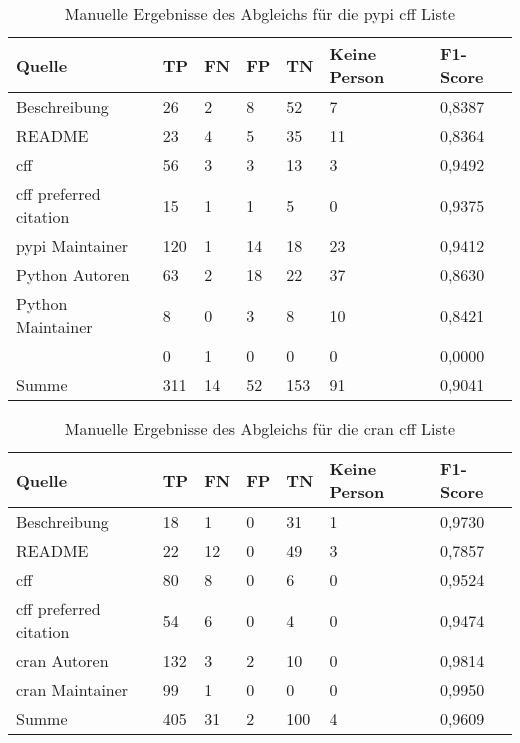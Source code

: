 \begin{table}[H]
    \centering
    \begin{tabularx}{\textwidth}{XR{.7cm}R{.7cm}R{.7cm}R{.7cm}R{2.8cm}R{2cm}}
        \toprule
        \textbf{Quelle} & \textbf{TP} & \textbf{FN} & \textbf{FP} & \textbf{TN} & \textbf{Keine Person} & \textbf{F1-Score} \\ \midrule
        Beschreibung                 & 26  & 2  & 8  & 52  & 7  & 0,8387 \\
        README                       & 23  & 4  & 5  & 35  & 11 & 0,8364 \\
        \gls{cff}                    & 56  & 3  & 3  & 13  & 3  & 0,9492 \\
        \gls{cff} preferred citation & 15  & 1  & 1  & 5   & 0  & 0,9375 \\
        \gls{pypi} Maintainer        & 120 & 1  & 14 & 18  & 23 & 0,9412 \\
        Python Autoren               & 63  & 2  & 18 & 22  & 37 & 0,8630 \\
        Python Maintainer            & 8   & 0  & 3  & 8   & 10 & 0,8421 \\
                      & 0   & 1  & 0  & 0   & 0  & 0,0000 \\ \midrule
        Summe                        & 311 & 14 & 52 & 153 & 91 & 0,9041 \\
        \bottomrule
    \end{tabularx}
    \caption{Manuelle Ergebnisse des Abgleichs für die \gls{pypi} \gls{cff} Liste}
    \label{tab:pypi_cff_matching_results_manual_anhang}
\end{table}

\begin{table}[H]
    \centering
    \begin{tabularx}{\textwidth}{XR{.7cm}R{.7cm}R{.7cm}R{.7cm}R{2.8cm}R{2cm}}
        \toprule
        \textbf{Quelle} & \textbf{TP} & \textbf{FN} & \textbf{FP} & \textbf{TN} & \textbf{Keine Person} & \textbf{F1-Score} \\ \midrule
        Beschreibung                 & 18  & 1  & 0 & 31  & 1 & 0,9730 \\
        README                       & 22  & 12 & 0 & 49  & 3 & 0,7857 \\
        \gls{cff}                    & 80  & 8  & 0 & 6   & 0 & 0,9524 \\
        \gls{cff} preferred citation & 54  & 6  & 0 & 4   & 0 & 0,9474 \\
        \gls{cran} Autoren           & 132 & 3  & 2 & 10  & 0 & 0,9814 \\
        \gls{cran} Maintainer        & 99  & 1  & 0 & 0   & 0 & 0,9950 \\ \midrule
        Summe                        & 405 & 31 & 2 & 100 & 4 & 0,9609 \\
        \bottomrule
    \end{tabularx}
    \caption{Manuelle Ergebnisse des Abgleichs für die \gls{cran} \gls{cff} Liste}
    \label{tab:cran_cff_matching_results_manual_anhang}
\end{table}
